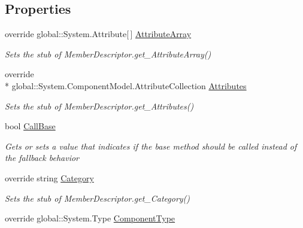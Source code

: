 \subsection*{Properties}
\begin{DoxyCompactItemize}
\item 
override global\-::\-System.\-Attribute\mbox{[}$\,$\mbox{]} \hyperlink{class_system_1_1_component_model_1_1_fakes_1_1_stub_event_descriptor_a0989f7d1e62728f3ae9d43c8a8d0a7fb}{Attribute\-Array}
\begin{DoxyCompactList}\small\item\em Sets the stub of Member\-Descriptor.\-get\-\_\-\-Attribute\-Array()\end{DoxyCompactList}\item 
override \\*
global\-::\-System.\-Component\-Model.\-Attribute\-Collection \hyperlink{class_system_1_1_component_model_1_1_fakes_1_1_stub_event_descriptor_a2137e0fe705ebcf958cc21286d9eb748}{Attributes}
\begin{DoxyCompactList}\small\item\em Sets the stub of Member\-Descriptor.\-get\-\_\-\-Attributes()\end{DoxyCompactList}\item 
bool \hyperlink{class_system_1_1_component_model_1_1_fakes_1_1_stub_event_descriptor_ab695d317fb24cb7ade781b5d9c810675}{Call\-Base}
\begin{DoxyCompactList}\small\item\em Gets or sets a value that indicates if the base method should be called instead of the fallback behavior\end{DoxyCompactList}\item 
override string \hyperlink{class_system_1_1_component_model_1_1_fakes_1_1_stub_event_descriptor_a9cab122d7e29d38e41bff23f208f6c8e}{Category}
\begin{DoxyCompactList}\small\item\em Sets the stub of Member\-Descriptor.\-get\-\_\-\-Category()\end{DoxyCompactList}\item 
override global\-::\-System.\-Type \hyperlink{class_system_1_1_component_model_1_1_fakes_1_1_stub_event_descriptor_a9755cd01ee3cf2b7880e262fc40cfe19}{Component\-Type}

\end{DoxyCompactItemize}
